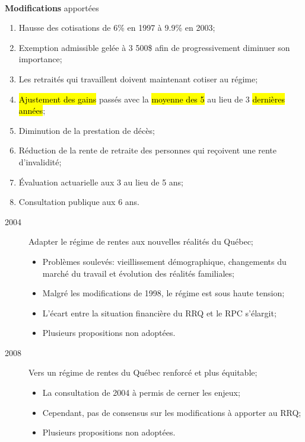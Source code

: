 \documentclass[10pt, french]{article}
\begin{document}
\begin{multicols*}{3}
\begin{rappel_enhanced}[Réforme de 1998]
\

\textbf{Modifications} apportées
\begin{enumerate}[leftmargin = *]
	\item	Hausse des cotisations de 6\% en 1997 à 9.9\% en 2003;
	\item	Exemption admissible \hypertarget{seuil_link}{gelée à 3 500\$} afin de progressivement diminuer son importance;
	\item	Les retraités qui travaillent doivent maintenant cotiser au régime;
	\item	\hl{Ajustement des gains} passés avec la \hl{moyenne des 5} au lieu de 3 \hl{dernières années};
	\item	Diminution de la prestation de décès;
	\item	Réduction de la rente de retraite des personnes qui reçoivent une rente d'invalidité;
	\item	Évaluation actuarielle aux 3 au lieu de 5 ans;
	\item	Consultation publique aux 6 ans.
\end{enumerate}
\end{rappel_enhanced}

\begin{rappel_enhanced}
\begin{description}
	\item[2004]	Adapter le régime de rentes aux nouvelles réalités du Québec;
		\begin{itemize}[leftmargin = *]
		\item	Problèmes soulevés: vieillissement démographique, changements du marché du travail et évolution des réalités familiales;
		\item	Malgré les modifications de 1998, le régime est sous haute tension;
		\item	L'écart entre la situation financière du RRQ et le RPC s'élargit;
		\item	Plusieurs propositions non adoptées.
		\end{itemize}
	\item[2008]	Vers un régime de rentes du Québec renforcé et plus équitable;
		\begin{itemize}[leftmargin = *]
		\item	La consultation de 2004 à permis de cerner les enjeux;
		\item	Cependant, pas de consensus sur les modifications à apporter au RRQ;
		\item	Plusieurs propositions non adoptées.
		\end{itemize}
\end{description}
\end{rappel_enhanced}


\end{multicols*}
\end{document}
